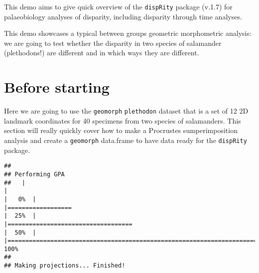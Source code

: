 \documentclass[
]{book}
\newenvironment{Shaded}{\begin{snugshade}}{\end{snugshade}}
\newcommand{\DocumentationTok}[1]{\textcolor[rgb]{0.56,0.35,0.01}{\textbf{\textit{#1}}}}
\newcommand{\FunctionTok}[1]{\textcolor[rgb]{0.13,0.29,0.53}{\textbf{#1}}}
\newcommand{\NormalTok}[1]{#1}
\newcommand{\OtherTok}[1]{\textcolor[rgb]{0.56,0.35,0.01}{#1}}
\newcommand{\SpecialCharTok}[1]{\textcolor[rgb]{0.81,0.36,0.00}{\textbf{#1}}}
\begin{document}
This demo aims to give quick overview of the \texttt{dispRity} package (v.1.7) for palaeobiology analyses of disparity, including disparity through time analyses.

This demo showcases a typical between groups geometric morphometric analysis: we are going to test whether the disparity in two species of salamander (plethodons!) are different and in which ways they are different.

\hypertarget{before-starting-1}{%
\section{Before starting}\label{before-starting-1}}

Here we are going to use the \texttt{geomorph} \texttt{plethodon} dataset that is a set of 12 2D landmark coordinates for 40 specimens from two species of salamanders.
This section will really quickly cover how to make a Procrustes sumperimposition analysis and create a \texttt{geomorph} data.frame to have data ready for the \texttt{dispRity} package.

\begin{Shaded}
\end{Shaded}

\begin{verbatim}
## 
## Performing GPA
##   |                                                                              |                                                                      |   0%  |                                                                              |==================                                                    |  25%  |                                                                              |===================================                                   |  50%  |                                                                              |======================================================================| 100%
## 
## Making projections... Finished!
\end{verbatim}
\end{document}
